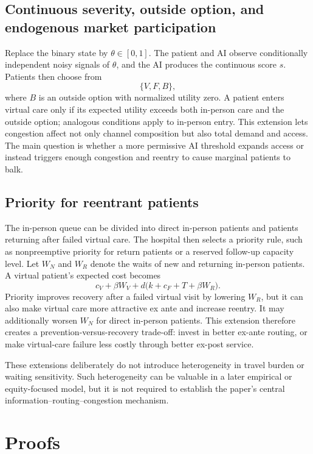 \documentclass[11pt]{article}
\begin{document}
\subsection{Continuous severity, outside option, and endogenous market participation}

Replace the binary state by $\theta\in[0,1]$.  The patient and AI observe conditionally independent noisy signals of $\theta$, and the AI produces the continuous score $s$.  Patients then choose from
\[
 \{V,F,B\},
\]
where $B$ is an outside option with normalized utility zero.  A patient enters virtual care only if its expected utility exceeds both in-person care and the outside option; analogous conditions apply to in-person entry.  This extension lets congestion affect not only channel composition but also total demand and access.  The main question is whether a more permissive AI threshold expands access or instead triggers enough congestion and reentry to cause marginal patients to balk.

\subsection{Priority for reentrant patients}

The in-person queue can be divided into direct in-person patients and patients returning after failed virtual care.  The hospital then selects a priority rule, such as nonpreemptive priority for return patients or a reserved follow-up capacity level.  Let $W_N$ and $W_R$ denote the waits of new and returning in-person patients.  A virtual patient's expected cost becomes
\[
 c_V+\beta W_V+d\big(k+c_F+T+\beta W_R\big).
\]
Priority improves recovery after a failed virtual visit by lowering $W_R$, but it can also make virtual care more attractive ex ante and increase reentry.  It may additionally worsen $W_N$ for direct in-person patients.  This extension therefore creates a prevention-versus-recovery trade-off: invest in better ex-ante routing, or make virtual-care failure less costly through better ex-post service.

These extensions deliberately do not introduce heterogeneity in travel burden or waiting sensitivity.  Such heterogeneity can be valuable in a later empirical or equity-focused model, but it is not required to establish the paper's central information--routing--congestion mechanism.

\appendix
\section{Proofs}
\end{document}
